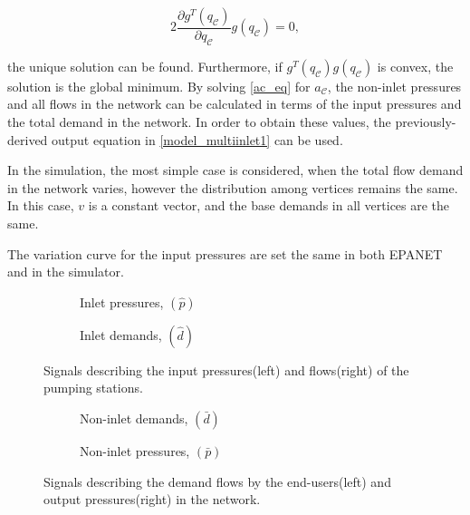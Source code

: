 \begin{equation}
\label{gradient_search} 
  2 \frac{\partial g^T(q_{\mathcal{C}})}{\partial q_{\mathcal{C}}} g(q_{\mathcal{C}}) = 0, 
\end{equation}

the unique solution can be found. Furthermore, if $g^T(q_{\mathcal{C}}) g(q_{\mathcal{C}})$ is convex, the solution is the global minimum. By solving \eqref{ac_eq} for $a_{\mathcal{C}}$, the non-inlet pressures and all flows in the network can be calculated in terms of the input pressures and the total demand in the network. In order to obtain these values, the previously-derived output equation in \eqref{model_multiinlet1} can be used. 

In the simulation, the most simple case is considered, when the total flow demand in the network varies, however the distribution among vertices remains the same. In this case, $v$ is a constant vector, and the base demands in all vertices are the same. 

The variation curve for the input pressures are set the same in both EPANET and in the simulator. 

\begin{figure}[H]
\centering
\begin{subfigure}{.49\textwidth}
\centering
   
  \caption{Inlet pressures, $(\hat{p})$}
  \label{fig:sub11_example1}
\end{subfigure}
\begin{subfigure}{.49\textwidth}
\centering
   
  \caption{Inlet demands, $(\hat{d})$}
  \label{fig:sub22_example1}
\end{subfigure}
\caption{Signals describing the input pressures(left) and flows(right) of the pumping stations.}
\label{fig:inlet_pressures_demands}
\end{figure}

\begin{figure}[H]
\centering
\begin{subfigure}{.49\textwidth}
\centering
   
  \caption{Non-inlet demands, $(\bar{d})$}
  \label{fig:sub21_example1}
\end{subfigure}
\begin{subfigure}{.49\textwidth}
\centering
   
  \caption{Non-inlet pressures, $(\bar{p})$}
  \label{fig:sub22_example1}
\end{subfigure}
\caption{Signals describing the demand flows by the end-users(left) and output pressures(right) in the network.}
\label{fig:noninlet_demands_noninlet_pressures}
\end{figure}

